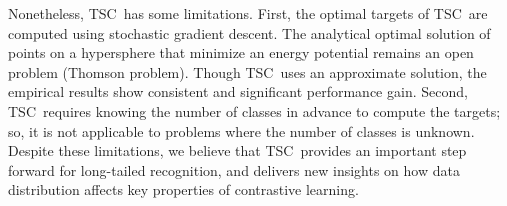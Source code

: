 \documentclass[10pt,twocolumn,letterpaper]{article}
\newcommand{\name} {TSC}
\begin{document}
Nonetheless, \name\ has some limitations. First, the optimal targets of \name\ are computed using stochastic gradient descent. The analytical optimal solution of points on a hypersphere that minimize an energy potential remains an open problem (Thomson problem). Though \name\ uses an approximate solution, the empirical results show consistent and significant performance gain. Second, \name~requires knowing the number of classes in advance to compute the targets; so, it is not applicable to problems where the number of classes is unknown. Despite these limitations, we believe that \name~provides an important step forward for long-tailed recognition, and delivers new insights on how data distribution affects key properties of contrastive learning. 

 





 {\small
 
 
 }
\end{document}
